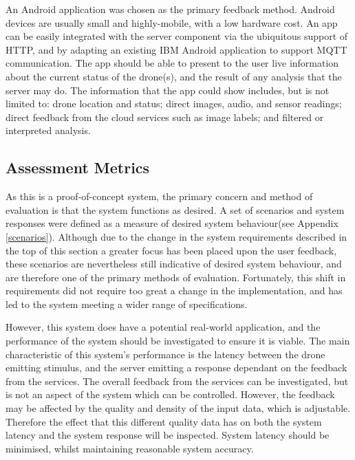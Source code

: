 \documentclass{article}
\begin{document}
An Android application was chosen as the primary feedback method. Android devices are usually small and highly-mobile, with a low hardware cost. An app can be easily integrated with the server component via the ubiquitous support of HTTP, and by adapting an existing IBM Android application to support MQTT communication\cite{iotStarterAndroid}. The app should be able to present to the user live information about the current status of the drone(s), and the result of any analysis that the server may do. The information that the app could show includes, but is not limited to: drone location and status; direct images, audio, and sensor readings; direct feedback from the cloud services such as image labels; and filtered or interpreted analysis.

\subsection{Assessment Metrics}
As this is a proof-of-concept system, the primary concern and method of evaluation is that the system functions as desired. A set of scenarios and system responses were defined as a measure of desired system behaviour(see Appendix \ref{scenarios}). Although due to the change in the system requirements described in the top of this section a greater focus has been placed upon the user feedback, these scenarios are nevertheless still indicative of desired system behaviour, and are therefore one of the primary methods of evaluation. Fortunately, this shift in requirements did not require too great a change in the implementation, and has led to the system meeting a wider range of specifications.

However, this system does have a potential real-world application, and the performance of the system should be investigated to ensure it is viable. The main characteristic of this system's performance is the latency between the drone emitting stimulus, and the server emitting a response dependant on the feedback from the services. The overall feedback from the services can be investigated, but is not an aspect of the system which can be controlled. However, the feedback may be affected by the quality and density of the input data, which is adjustable. Therefore the effect that this different quality data has on both the system latency and the system response will be inspected. System latency should be minimised, whilst maintaining reasonable system accuracy.
\end{document}
